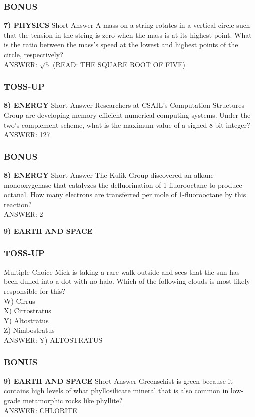 \subsubsection*{BONUS}
\textbf{7) PHYSICS}
Short Answer A mass on a string rotates in a vertical circle such that the tension in the string is zero when the mass is at its highest point. What is the ratio between the mass's speed at the lowest and highest points of the circle, respectively?
\\ANSWER: $\sqrt{5}$ (READ: THE SQUARE ROOT OF FIVE)

\newpage

\subsubsection*{TOSS-UP}
\textbf{8) ENERGY}
Short Answer Researchers at CSAIL's Computation Structures Group are developing memory-efficient numerical computing systems. Under the two's complement scheme, what is the maximum value of a signed 8-bit integer?
\\ANSWER: 127

\subsubsection*{BONUS}
\textbf{8) ENERGY}
Short Answer The Kulik Group discovered an alkane monooxygenase that catalyzes the defluorination of 1-fluorooctane to produce octanal. How many electrons are transferred per mole of 1-fluorooctane by this reaction?
\\ANSWER: 2

\textbf{9) EARTH AND SPACE}
\subsubsection*{TOSS-UP}
Multiple Choice Mick is taking a rare walk outside and sees that the sun has been dulled into a dot with no halo. Which of the following clouds is most likely responsible for this?
\\W) Cirrus
\\X) Cirrostratus
\\Y) Altostratus
\\Z) Nimbostratus
\\ANSWER: Y) ALTOSTRATUS

\subsubsection*{BONUS}
\textbf{9) EARTH AND SPACE}
Short Answer Greenschist is green because it contains high levels of what phyllosilicate mineral that is also common in low-grade metamorphic rocks like phyllite?
\\ANSWER: CHLORITE


